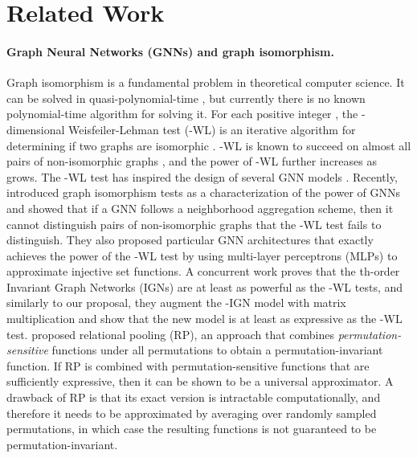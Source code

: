 \documentclass{article}
\begin{document}
\section{Related Work}
\paragraph{Graph Neural Networks (GNNs) and graph isomorphism.} Graph isomorphism is a fundamental problem in theoretical computer science. 
It can be solved in quasi-polynomial-time \cite{babai2016graph}, but currently there is no known polynomial-time algorithm for solving it. For each positive integer , the -dimensional Weisfeiler-Lehman test (-WL) is an iterative algorithm for determining if two graphs are isomorphic \cite{weisfeiler1968reduction}. -WL is known to succeed on almost all pairs of non-isomorphic graphs \cite{babai1980random}, and the power of -WL further increases as  grows. The -WL test has inspired the design of several GNN models \cite{hamilton2017inductive, zhang2017wlnm}.
Recently,  
\cite{xu2018powerful, morris2019higher} introduced graph isomorphism tests as a characterization of the power of GNNs and showed that if a GNN follows a neighborhood aggregation scheme, then it cannot distinguish pairs of non-isomorphic graphs that the -WL test fails to distinguish. They also proposed particular GNN architectures that exactly achieves the power of the -WL test by using multi-layer perceptrons (MLPs) to approximate injective set functions. 
A concurrent work \cite{maron2019provably} proves that the th-order Invariant Graph Networks (IGNs) are at least as powerful as the -WL tests, and similarly to our proposal, they augment the -IGN model with matrix multiplication and show that the new model is at least as expressive as the -WL test. \cite{murphy2019relational} proposed relational pooling (RP), an approach that combines \textit{permutation-sensitive} functions under all permutations to obtain a permutation-invariant function. If RP is combined with permutation-sensitive functions that are sufficiently expressive, then it can be shown to be a universal approximator. 
A drawback of RP is that its exact version is intractable computationally, and therefore it needs to be approximated by averaging over randomly sampled permutations, in which case the resulting functions is not guaranteed to be permutation-invariant. 
\end{document}
